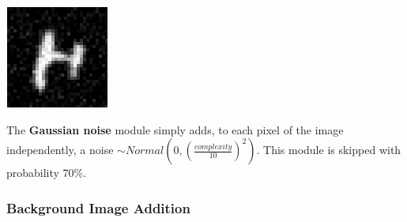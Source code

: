 \documentclass{article} %
\begin{document}
\begin{minipage}[t]{0.14\textwidth}
\begin{center}
\vspace*{0mm}
\includegraphics[scale=.4]{images/Distorsiongauss_only.png}
\end{center}
\end{minipage}%
\hspace{0.3cm}\begin{minipage}[t]{0.86\linewidth}
\vspace*{1mm}
The {\bf Gaussian noise} module simply adds, to each pixel of the image independently, a
noise $\sim Normal(0,(\frac{complexity}{10})^2)$.
This module is skipped with probability 70\%.
\end{minipage}


\subsubsection*{Background Image Addition}
\end{document}
